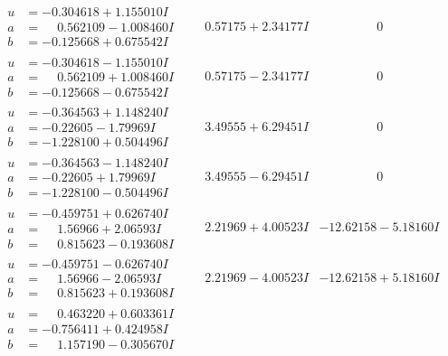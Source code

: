\documentclass[1p]{elsarticle_modified}
\theoremstyle{definition}
\begin{document}
$$\begin{array}{c|c|c}
\begin{aligned}
u &= -0.304618 + 1.155010 I \\
a &= \phantom{-}0.562109 - 1.008460 I \\
b &= -0.125668 + 0.675542 I\end{aligned}
 & \phantom{-}0.57175 + 2.34177 I & \phantom{-0.000000 } 0 \\ \hline\begin{aligned}
u &= -0.304618 - 1.155010 I \\
a &= \phantom{-}0.562109 + 1.008460 I \\
b &= -0.125668 - 0.675542 I\end{aligned}
 & \phantom{-}0.57175 - 2.34177 I & \phantom{-0.000000 } 0 \\ \hline\begin{aligned}
u &= -0.364563 + 1.148240 I \\
a &= -0.22605 - 1.79969 I \\
b &= -1.228100 + 0.504496 I\end{aligned}
 & \phantom{-}3.49555 + 6.29451 I & \phantom{-0.000000 } 0 \\ \hline\begin{aligned}
u &= -0.364563 - 1.148240 I \\
a &= -0.22605 + 1.79969 I \\
b &= -1.228100 - 0.504496 I\end{aligned}
 & \phantom{-}3.49555 - 6.29451 I & \phantom{-0.000000 } 0 \\ \hline\begin{aligned}
u &= -0.459751 + 0.626740 I \\
a &= \phantom{-}1.56966 + 2.06593 I \\
b &= \phantom{-}0.815623 - 0.193608 I\end{aligned}
 & \phantom{-}2.21969 + 4.00523 I & -12.62158 - 5.18160 I \\ \hline\begin{aligned}
u &= -0.459751 - 0.626740 I \\
a &= \phantom{-}1.56966 - 2.06593 I \\
b &= \phantom{-}0.815623 + 0.193608 I\end{aligned}
 & \phantom{-}2.21969 - 4.00523 I & -12.62158 + 5.18160 I \\ \hline\begin{aligned}
u &= \phantom{-}0.463220 + 0.603361 I \\
a &= -0.756411 + 0.424958 I \\
b &= \phantom{-}1.157190 - 0.305670 I\end{aligned}

\end{array}$$
\end{document}
